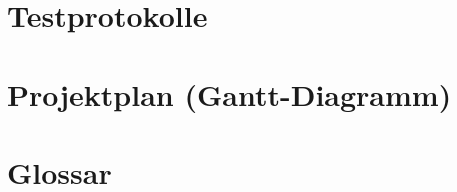 \documentclass[11pt,a4paper]{article}
\begin{document}
\section{Testprotokolle}

\section{Projektplan (Gantt-Diagramm)}

\section{Glossar}

\begin{thebibliography}{99}
\end{thebibliography}
\end{document}
